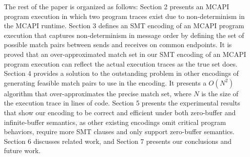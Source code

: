 The rest of the paper is organized as follows: Section 2 presents an
MCAPI program execution in which two program traces exist due to
non-determinism in the MCAPI runtime. Section 3 defines an SMT
encoding of an MCAPI program execution that captures non-determinism
in message order by defining the set of possible match pairs between
sends and receives on common endpoints. It is proved that an
over-approximated match set in our SMT encoding of an MCAPI program
execution can reflect the actual execution traces as the true set
does. Section 4 provides a solution to the outstanding problem in
other encodings of generating feasible match pairs to use in the
encoding. It presents a $O(N^2)$ algorithm that over-approximates the
precise match set, where $N$ is the size of the execution trace in
lines of code. Section 5 presents the experimental results that show
our encoding to be correct and efficient under both zero-buffer and
infinite-buffer semantics, as other existing encodings omit critical
program behaviors, require more SMT clauses and only support
zero-buffer semantics. Section 6 discusses related work, and Section 7
presents our conclusions and future work.


